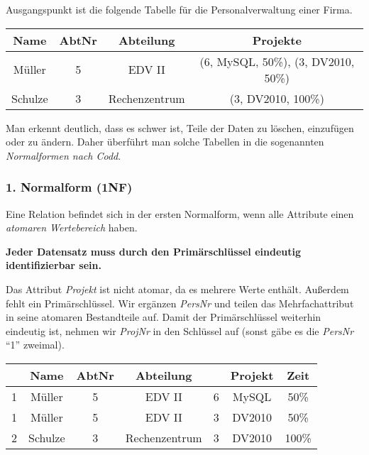 \documentclass[9pt,a4paper]{arbeitsblatt}
\begin{document}
\ReiheTitel

Ausgangspunkt ist die folgende Tabelle für die Personalverwaltung einer Firma.

\begin{center}
	\begin{tabular}{|c|c|c|c|}\hline
		\rowcolor{ab.tabelle.kopf.hg} Name & AbtNr & Abteilung     & Projekte                            \\\hline
		Müller                             & 5     & EDV II        & (6, MySQL, 50\%), (3, DV2010, 50\%) \\\hline
		Schulze                            & 3     & Rechenzentrum & (3, DV2010, 100\%)                  \\\hline
	\end{tabular}
\end{center}

Man erkennt deutlich, dass es schwer ist, Teile der Daten zu löschen,
einzufügen oder zu ändern. Daher überführt man solche Tabellen in die
sogenannten \emph{Normalformen nach Codd}.

\begin{infobox}\vspace*{-1em}
	\subsubsection*{1. Normalform (1NF)}

	Eine Relation befindet sich in der ersten Normalform, wenn alle Attribute einen
	\emph{atomaren Wertebereich} haben.

	\textbf{Jeder Datensatz muss durch den Primärschlüssel eindeutig identifizierbar sein.}
\end{infobox}

Das Attribut \emph{Projekt} ist nicht atomar, da es mehrere Werte
enthält. Außerdem fehlt ein Primärschlüssel. Wir ergänzen
\emph{PersNr} und teilen das Mehrfachattribut in seine atomaren
Bestandteile auf. Damit der Primärschlüssel weiterhin eindeutig ist, nehmen wir
\emph{ProjNr} in den Schlüssel auf (sonst gäbe es die
\emph{PersNr} \enquote{1} zweimal).

\begin{center}
	\begin{tabular}{|c|c|c|c|c|c|c|}\hline
		\rowcolor{ab.tabelle.kopf.hg} \primarykey{PersNr} & Name    & AbtNr & Abteilung     & \primarykey{ProjNr} & Projekt & Zeit  \\\hline
		1                                                 & Müller  & 5     & EDV II        & 6                   & MySQL   & 50\%  \\\hline
		1                                                 & Müller  & 5     & EDV II        & 3                   & DV2010  & 50\%  \\\hline
		2                                                 & Schulze & 3     & Rechenzentrum & 3                   & DV2010  & 100\% \\\hline
	\end{tabular}
\end{center}
\end{document}
